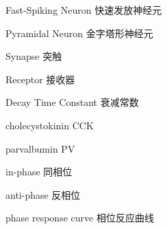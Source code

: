 \begin{denotation}

\item[Fast-Spiking Neuron] 快速发放神经元
\item[Pyramidal Neuron] 金字塔形神经元
\item[Synapse] 突触
\item[Receptor] 接收器
\item[Decay Time Constant] 衰减常数
\item[cholecystokinin] CCK
\item[parvalbumin] PV
\item[in-phase] 同相位
\item[anti-phase] 反相位
\item[phase response curve] 相位反应曲线
\end{denotation}
